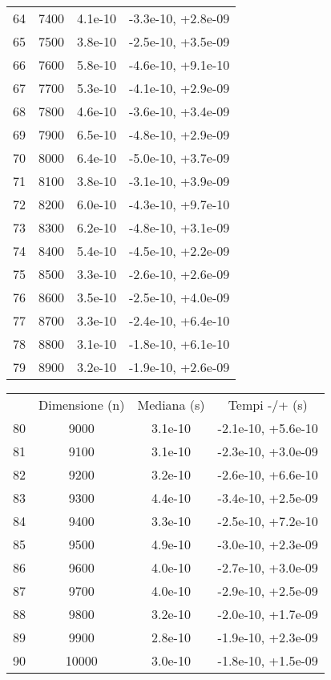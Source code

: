 \begin{table}
\begin{adjustbox}{width=1\textwidth/2}
\begin{tabular}{|c|c|c|c|}
\cline{1-4}
64 & 7400 & 4.1e-10 & -3.3e-10, +2.8e-09 \\
\cline{1-4}
65 & 7500 & 3.8e-10 & -2.5e-10, +3.5e-09 \\
\cline{1-4}
66 & 7600 & 5.8e-10 & -4.6e-10, +9.1e-10 \\
\cline{1-4}
67 & 7700 & 5.3e-10 & -4.1e-10, +2.9e-09 \\
\cline{1-4}
68 & 7800 & 4.6e-10 & -3.6e-10, +3.4e-09 \\
\cline{1-4}
69 & 7900 & 6.5e-10 & -4.8e-10, +2.9e-09 \\
\cline{1-4}
70 & 8000 & 6.4e-10 & -5.0e-10, +3.7e-09 \\
\cline{1-4}
71 & 8100 & 3.8e-10 & -3.1e-10, +3.9e-09 \\
\cline{1-4}
72 & 8200 & 6.0e-10 & -4.3e-10, +9.7e-10 \\
\cline{1-4}
73 & 8300 & 6.2e-10 & -4.8e-10, +3.1e-09 \\
\cline{1-4}
74 & 8400 & 5.4e-10 & -4.5e-10, +2.2e-09 \\
\cline{1-4}
75 & 8500 & 3.3e-10 & -2.6e-10, +2.6e-09 \\
\cline{1-4}
76 & 8600 & 3.5e-10 & -2.5e-10, +4.0e-09 \\
\cline{1-4}
77 & 8700 & 3.3e-10 & -2.4e-10, +6.4e-10 \\
\cline{1-4}
78 & 8800 & 3.1e-10 & -1.8e-10, +6.1e-10 \\
\cline{1-4}
79 & 8900 & 3.2e-10 & -1.9e-10, +2.6e-09 \\
\cline{1-4}
\end{tabular}
\end{adjustbox}
\end{table}

\begin{table}
\centering
\begin{adjustbox}{width=1\textwidth/2}
\begin{tabular}{|c|c|c|c|}
\hline
 & Dimensione (n) & Mediana (s) & Tempi -/+ (s) \\
80 & 9000 & 3.1e-10 & -2.1e-10, +5.6e-10 \\
\cline{1-4}
81 & 9100 & 3.1e-10 & -2.3e-10, +3.0e-09 \\
\cline{1-4}
82 & 9200 & 3.2e-10 & -2.6e-10, +6.6e-10 \\
\cline{1-4}
83 & 9300 & 4.4e-10 & -3.4e-10, +2.5e-09 \\
\cline{1-4}
84 & 9400 & 3.3e-10 & -2.5e-10, +7.2e-10 \\
\cline{1-4}
85 & 9500 & 4.9e-10 & -3.0e-10, +2.3e-09 \\
\cline{1-4}
86 & 9600 & 4.0e-10 & -2.7e-10, +3.0e-09 \\
\cline{1-4}
87 & 9700 & 4.0e-10 & -2.9e-10, +2.5e-09 \\
\cline{1-4}
88 & 9800 & 3.2e-10 & -2.0e-10, +1.7e-09 \\
\cline{1-4}
89 & 9900 & 2.8e-10 & -1.9e-10, +2.3e-09 \\
\cline{1-4}
90 & 10000 & 3.0e-10 & -1.8e-10, +1.5e-09 \\
\cline{1-4}
\end{tabular}
\end{adjustbox}
\end{table}

